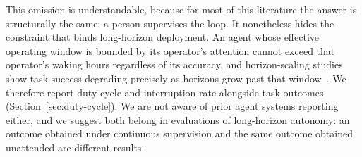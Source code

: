 This omission is understandable, because for most of this literature the answer is
structurally the same: a person supervises the loop. It nonetheless hides the
constraint that binds long-horizon deployment. An agent whose effective operating
window is bounded by its operator's attention cannot exceed that operator's waking
hours regardless of its accuracy, and horizon-scaling studies show task success
degrading precisely as horizons grow past that window~\citep{kwa2025longtasks}. We
therefore report duty cycle and interruption rate alongside task outcomes
(Section~\ref{sec:duty-cycle}). We are not aware of prior agent systems reporting
either, and we suggest both belong in evaluations of long-horizon autonomy: an
outcome obtained under continuous supervision and the same outcome obtained
unattended are different results.
